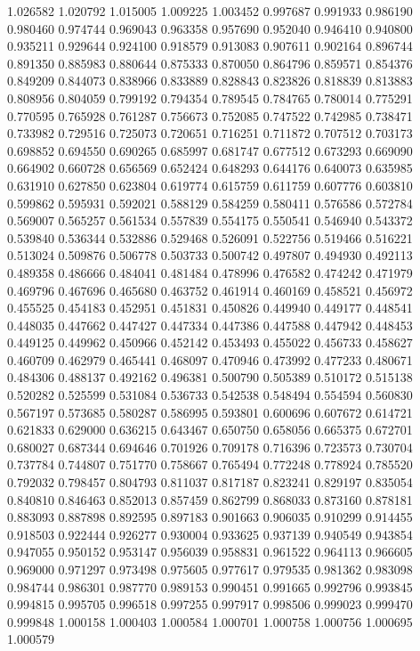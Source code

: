 1.026582
1.020792
1.015005
1.009225
1.003452
0.997687
0.991933
0.986190
0.980460
0.974744
0.969043
0.963358
0.957690
0.952040
0.946410
0.940800
0.935211
0.929644
0.924100
0.918579
0.913083
0.907611
0.902164
0.896744
0.891350
0.885983
0.880644
0.875333
0.870050
0.864796
0.859571
0.854376
0.849209
0.844073
0.838966
0.833889
0.828843
0.823826
0.818839
0.813883
0.808956
0.804059
0.799192
0.794354
0.789545
0.784765
0.780014
0.775291
0.770595
0.765928
0.761287
0.756673
0.752085
0.747522
0.742985
0.738471
0.733982
0.729516
0.725073
0.720651
0.716251
0.711872
0.707512
0.703173
0.698852
0.694550
0.690265
0.685997
0.681747
0.677512
0.673293
0.669090
0.664902
0.660728
0.656569
0.652424
0.648293
0.644176
0.640073
0.635985
0.631910
0.627850
0.623804
0.619774
0.615759
0.611759
0.607776
0.603810
0.599862
0.595931
0.592021
0.588129
0.584259
0.580411
0.576586
0.572784
0.569007
0.565257
0.561534
0.557839
0.554175
0.550541
0.546940
0.543372
0.539840
0.536344
0.532886
0.529468
0.526091
0.522756
0.519466
0.516221
0.513024
0.509876
0.506778
0.503733
0.500742
0.497807
0.494930
0.492113
0.489358
0.486666
0.484041
0.481484
0.478996
0.476582
0.474242
0.471979
0.469796
0.467696
0.465680
0.463752
0.461914
0.460169
0.458521
0.456972
0.455525
0.454183
0.452951
0.451831
0.450826
0.449940
0.449177
0.448541
0.448035
0.447662
0.447427
0.447334
0.447386
0.447588
0.447942
0.448453
0.449125
0.449962
0.450966
0.452142
0.453493
0.455022
0.456733
0.458627
0.460709
0.462979
0.465441
0.468097
0.470946
0.473992
0.477233
0.480671
0.484306
0.488137
0.492162
0.496381
0.500790
0.505389
0.510172
0.515138
0.520282
0.525599
0.531084
0.536733
0.542538
0.548494
0.554594
0.560830
0.567197
0.573685
0.580287
0.586995
0.593801
0.600696
0.607672
0.614721
0.621833
0.629000
0.636215
0.643467
0.650750
0.658056
0.665375
0.672701
0.680027
0.687344
0.694646
0.701926
0.709178
0.716396
0.723573
0.730704
0.737784
0.744807
0.751770
0.758667
0.765494
0.772248
0.778924
0.785520
0.792032
0.798457
0.804793
0.811037
0.817187
0.823241
0.829197
0.835054
0.840810
0.846463
0.852013
0.857459
0.862799
0.868033
0.873160
0.878181
0.883093
0.887898
0.892595
0.897183
0.901663
0.906035
0.910299
0.914455
0.918503
0.922444
0.926277
0.930004
0.933625
0.937139
0.940549
0.943854
0.947055
0.950152
0.953147
0.956039
0.958831
0.961522
0.964113
0.966605
0.969000
0.971297
0.973498
0.975605
0.977617
0.979535
0.981362
0.983098
0.984744
0.986301
0.987770
0.989153
0.990451
0.991665
0.992796
0.993845
0.994815
0.995705
0.996518
0.997255
0.997917
0.998506
0.999023
0.999470
0.999848
1.000158
1.000403
1.000584
1.000701
1.000758
1.000756
1.000695
1.000579
